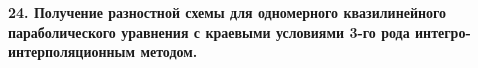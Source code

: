 \documentclass[a4paper,14pt]{article}
\begin{document}
\newpage
\begin{figure}[!h]
	\label{fig:t239}
\end{figure}

\newpage
\begin{figure}[!h]
	\label{fig:t2310}
\end{figure}

\textbf{24. Получение разностной схемы для одномерного квазилинейного параболического уравнения с краевыми условиями 3-го рода интегро-интерполяционным методом.}
\end{document}
